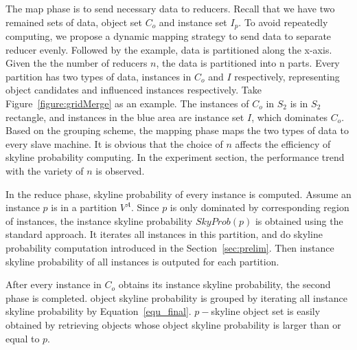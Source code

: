 %
%
The map phase is to send necessary data to reducers.
Recall that we have two remained sets of data, object set $C_o$ and instance set $I_p$. To avoid repeatedly computing, we propose a dynamic mapping strategy to send data to separate reducer evenly. Followed by the example, data is partitioned along the x-axis. Given the the number of reducers $n$, the data is partitioned into n parts.
Every partition has two types of data, instances in $C_o$ and $I$ respectively, representing object candidates and influenced instances respectively. Take Figure~\ref{figure:gridMerge} as an example. The instances of $C_o$ in $S_2$ is in $S_2$ rectangle, and instances in the blue area are instance set $I$, which dominates $C_o$. Based on the grouping scheme, the mapping phase maps the two types of data to every slave machine. It is obvious that the choice of $n$ affects the efficiency of skyline probability computing. In the experiment section, the performance trend with the variety of $n$ is observed.

In the reduce phase, skyline probability of every instance is computed. Assume an instance $p$ is in a partition $V^A$. Since $p$ is only dominated by corresponding region of instances, the instance skyline probability $SkyProb(p)$ is obtained using the standard approach.  It iterates all instances in this partition, and do skyline probability computation introduced in the Section~\ref{sec:prelim}. Then instance skyline probability of all instances is outputed for each partition. 

After every instance in $C_o$ obtains its instance skyline probability, the second phase is completed. object skyline probability is grouped by iterating all instance skyline probability by Equation~\ref{equ_final}. $p-$skyline object set is easily obtained by retrieving objects whose object skyline probability is larger than or equal to $p$.

